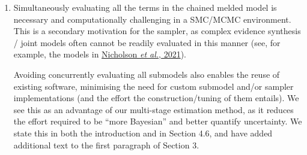 \documentclass[
  10pt,
  a4paper,
]{article}
\begin{document}
\begin{enumerate}
\def\labelenumi{\arabic{enumi}.}
\item
  Simultaneously evaluating all the terms in the chained melded model is
  necessary and computationally challenging in a SMC/MCMC environment.
  This is a secondary motivation for the sampler, as complex evidence
  synthesis / joint models often cannot be readily evaluated in this
  manner (see, for example, the models in
  \protect\hyperlink{ref-nicholson_interoperability_2021}{Nicholson
  \emph{et al.}, 2021}).

  Avoiding concurrently evaluating all submodels also enables the reuse
  of existing software, minimising the need for custom submodel and/or
  sampler implementations (and the effort the construction/tuning of
  them entails). We see this as an advantage of our multi-stage
  estimation method, as it reduces the effort required to be ``more
  Bayesian'' and better quantify uncertainty. We state this in both the
  introduction and in Section 4.6, and have added additional text to the
  first paragraph of Section 3.


\end{enumerate}
\end{document}
